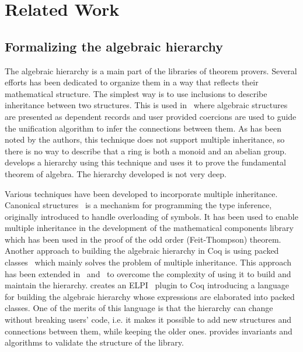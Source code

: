 \chapter{Related Work}
\label{ch:relatedwork}

\section{Formalizing the algebraic hierarchy}
The algebraic hierarchy is a main part of the libraries of theorem provers. Several efforts has been dedicated to organize them in a way that reflects their mathematical structure. 
The simplest way is to use inclusions to describe inheritance between two structures. This is used in~\cite{Geuvers2002} where algebraic structures are presented as dependent records and user provided coercions are used to guide the unification algorithm to infer the connections between them. As has been noted by the authors, this technique does not support multiple inheritance, so there is no way to describe that a ring is both a monoid and an abelian group. \cite{Geuvers2002} develops a hierarchy using this technique and uses it to prove the fundamental theorem of algebra. The hierarchy developed is not very deep. 

Various techniques have been developed to incorporate multiple inheritance. Canonical structures~\cite{canonical2013} is a mechanism for programming the type inference, originally introduced to handle overloading of symbols. It has been used to enable multiple inheritance in the development of the mathematical components library~\cite{mathCompLib} which has been used in the proof of the odd order (Feit-Thompson) theorem. 
% 
Another approach to building the algebraic hierarchy in Coq is using packed classes~\cite{Gonthier2009} which mainly solves the problem of multiple inheritance. This approach has been extended in~\cite{cohen2020hierarchy} and~\cite{sakaguchi2020validating} to overcome the complexity of using it to build and maintain the hierarchy. \cite{cohen2020hierarchy} creates an ELPI~\cite{elpi,elpiForCoq} plugin to Coq introducing a language for building the algebraic hierarchy whose expressions are elaborated into packed classes. One of the merits of this language is that the hierarchy can change without breaking users' code, i.e. it makes it possible to add new structures and connections between them, while keeping the older ones. \cite{sakaguchi2020validating} provides invariants and algorithms to validate the structure of the library.  


